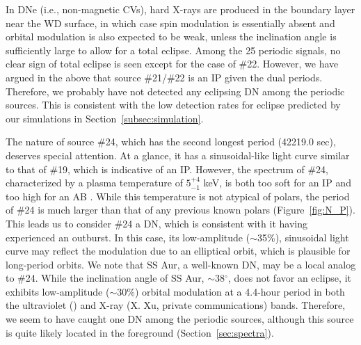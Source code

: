 \documentclass[fleqn,usenatbib]{mnras}
\begin{document}
In DNe (i.e., non-magnetic CVs), hard X-rays are produced in the boundary layer near the WD surface, in which case spin modulation is essentially absent and orbital modulation is also expected to be weak, unless the inclination angle is sufficiently large to allow for a total eclipse. Among the 25 periodic signals, no clear sign of total eclipse is seen except for the case of \#22. However, we have argued in the above that source \#21/\#22 is an IP given the dual periods. Therefore, we probably have not detected any eclipsing DN among the periodic sources. This is consistent with the low detection rates for eclipse predicted by our simulations in Section~\ref{subsec:simulation}. 

The nature of source \#24, which has the second longest period (42219.0 sec), deserves special attention. At a glance, it has a sinusoidal-like light curve similar to that of \#19, which is indicative of an IP. However, the spectrum of \#24, characterized by a plasma temperature of $5^{+4}_{-1}$ keV, is both too soft for an IP \citep{2016ApJ...818..136X}
and too high for an AB \citep{2004A&ARv..12...71G}. 
While this temperature is not atypical of polars, the period of \#24 is much larger than that of any previous known polars (Figure~\ref{fig:N_P}). 
This leads us to consider \#24 a DN, which is consistent with it having experienced an outburst.  In this case, its low-amplitude ($\sim$35\%), sinusoidal light curve may reflect the modulation due to an elliptical orbit, which is plausible for long-period orbits. 
We note that SS Aur, a well-known DN, may be a local analog to \#24. 
While the inclination angle of SS Aur,  $\sim$38$^\circ$, does not favor an eclipse, it exhibits low-amplitude ($\sim30\%$) orbital modulation at a 4.4-hour period in both the ultraviolet  (\citealt{1983ApJ...271..754W,1986Afz....24..227E}) and X-ray (X. Xu, private communications) bands.
Therefore, we seem to have caught one DN among the periodic sources, although this source is quite likely located in the foreground (Section~\ref{sec:spectra}).
\end{document}
